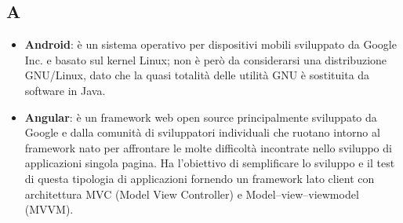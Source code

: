 \subsection{A}
\begin{itemize}
	\item
	\textbf{Android}: è un sistema operativo per dispositivi mobili sviluppato da Google Inc. e basato sul kernel Linux; non è però da considerarsi una distribuzione GNU/Linux, dato che la quasi totalità delle utilità GNU è sostituita da software in Java.
	\item
	\textbf{Angular}: è un framework web open source principalmente sviluppato da Google e dalla comunità di sviluppatori individuali che ruotano intorno al framework nato per affrontare le molte difficoltà incontrate nello sviluppo di applicazioni singola pagina. Ha l'obiettivo di semplificare lo sviluppo e il test di questa tipologia di applicazioni fornendo un framework lato client con architettura MVC (Model View Controller) e Model–view–viewmodel (MVVM).
\end{itemize}